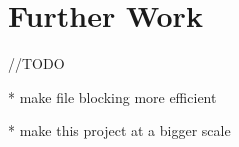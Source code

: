 \chapter{Further Work}

//TODO

* make file blocking more efficient

* make this project at a bigger scale